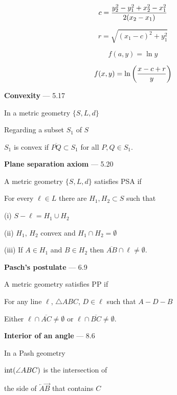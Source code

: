 \nopagenumbers

$$c={y_2^2-y_1^2+x_2^2-x_1^2\over2(x_2-x_1)}$$

$$r=\sqrt{(x_1-c)^2+y_1^2}$$

$$f(a,y)=\ln y$$

$$f(x,y)=\ln\left({x-c+r\over y}\right)$$

\vfill
\eject

\noindent
{\bf Convexity} --- 5.17

\bigskip
\noindent
In a metric geometry $\{S,L,d\}$

\bigskip
\noindent
Regarding a subset $S_1$ of $S$

\bigskip
\noindent
$S_1$ is convex if $\overline{PQ}\subset S_1$ for all $P,Q\in S_1$.

\vfill
\eject

\noindent
{\bf Plane separation axiom} --- 5.20

\bigskip
\noindent
A metric geometry $\{S,L,d\}$ satisfies PSA if

\bigskip
\noindent
For every $\ell\in L$ there are $H_1,H_2\subset S$ such that

\bigskip
\item{(i)} $S-\ell=H_1\cup H_2$

\bigskip
\item{(ii)} $H_1$, $H_2$ convex and $H_1\cap H_2=\emptyset$

\bigskip
\item{(iii)} If $A\in H_1$ and $B\in H_2$ then $\overline{AB}\cap\ell\ne\emptyset$.

\vfill
\eject

\noindent
{\bf Pasch's postulate} --- 6.9

\bigskip
\noindent
A metric geometry satisfies PP if

\bigskip
\noindent
For any line $\ell$, $\triangle ABC$, $D\in\ell$ such that $A{-}D{-}B$

\bigskip
\noindent
Either $\ell\cap\overline{AC}\ne\emptyset$ or $\ell\cap\overline{BC}\ne\emptyset$.

\vfill
\eject

\noindent
{\bf Interior of an angle} --- 8.6

\bigskip
\noindent
In a Pash geometry

\bigskip
\noindent
$\mathop{\hbox{int}}(\angle ABC)$ is the intersection of

\bigskip
\item{} the side of $\overleftarrow A\overrightarrow B$ that contains $C$

